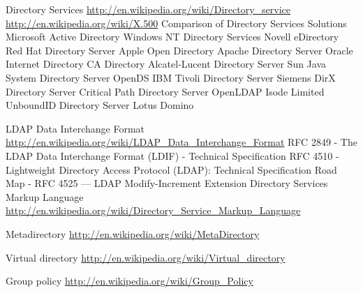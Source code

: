 Directory Services
\newline
\url{http://en.wikipedia.org/wiki/Directory_service}
\newline
\url{http://en.wikipedia.org/wiki/X.500}
Comparison of Directory Services Solutions
\newline
Microsoft Active Directory
\newline
Windows NT Directory Services
\newline
Novell eDirectory
\newline
Red Hat Directory Server
\newline
Apple Open Directory
\newline
Apache Directory Server
\newline
Oracle Internet Directory
\newline
CA Directory
\newline
Alcatel-Lucent Directory Server
\newline
Sun Java System Directory Server
\newline
OpenDS
\newline
IBM Tivoli Directory Server
\newline
Siemens DirX Directory Server
\newline
Critical Path Directory Server
\newline
OpenLDAP
\newline
Isode Limited
\newline
UnboundID Directory Server
\newline
Lotus Domino

LDAP Data Interchange Format
\newline
\url{http://en.wikipedia.org/wiki/LDAP_Data_Interchange_Format}
\newline
RFC 2849 -  The LDAP Data Interchange Format (LDIF) - Technical Specification
\newline
RFC 4510 - Lightweight Directory Access Protocol (LDAP): Technical Specification Road Map -           
RFC 4525 — LDAP Modify-Increment Extension
Directory Services Markup Language
\newline
\url{http://en.wikipedia.org/wiki/Directory_Service_Markup_Language}

Metadirectory
\newline\url{http://en.wikipedia.org/wiki/MetaDirectory}

Virtual directory
\url{http://en.wikipedia.org/wiki/Virtual_directory}

Group policy
\newline\url{http://en.wikipedia.org/wiki/Group_Policy}

